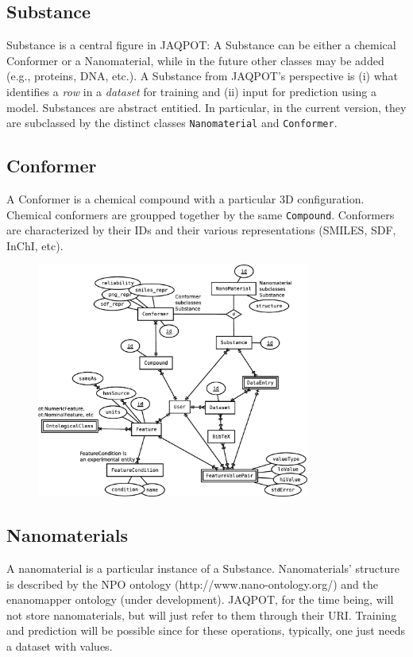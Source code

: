 \subsection{Substance}
Substance is a central figure in JAQPOT: A Substance can be either a
chemical Conformer or a Nanomaterial, while in the future other classes
may be added (e.g., proteins, DNA, etc.). A Substance from JAQPOT's
perspective is (i) what identifies a \textit{row} in a \textit{dataset} for
training and (ii) input for prediction using a model.
Substances are abstract entitied. In particular, in the current version, they
are subclassed by the distinct classes \texttt{Nanomaterial} and \texttt{Conformer}.

\subsection{Conformer}
A Conformer is a chemical compound with a particular 3D configuration.
Chemical conformers are groupped together by the same \texttt{Compound}.
Conformers are characterized by their IDs and their various representations
(SMILES, SDF, InChI, etc).

\begin{figure}[h]
 \centering
 \includegraphics[keepaspectratio=true,width=0.8\textwidth]{figures/chemical_data}
\end{figure}

\subsection{Nanomaterials}
A nanomaterial is a particular instance of a Substance. Nanomaterials'
structure is described by the NPO ontology (http://www.nano-ontology.org/)
and the enanomapper ontology (under development). JAQPOT, for the time 
being, will not store nanomaterials, but will just refer to them 
through their URI. Training and prediction will be possible since for
these operations, typically, one just needs a dataset with values.



